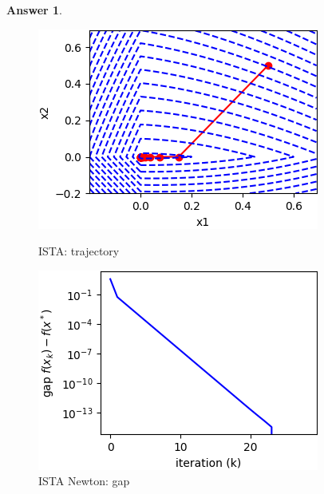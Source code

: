 \documentclass{article}
\theoremstyle{definition}
\newtheorem{ans}{Answer}
\begin{document}
\begin{ans}
\begin{enumerate}[(a)]
			\begin{figure}[h]
				\begin{minipage}[t]{0.5\linewidth}
					\centering
					\includegraphics[width=0.9\linewidth]{../figures/4/ista_traces_lambda8}
					\caption{ISTA: trajectory}
					\label{p35}
				\end{minipage}
				\begin{minipage}[t]{0.5\linewidth}
					\centering
					\includegraphics[width=0.9\linewidth]{../figures/4/ista_gap_lambda8}
					\caption{ISTA Newton: gap}
					\label{p36}
				\end{minipage}		
			\end{figure}
		
		\end{enumerate}
	\end{ans}
\end{document}

